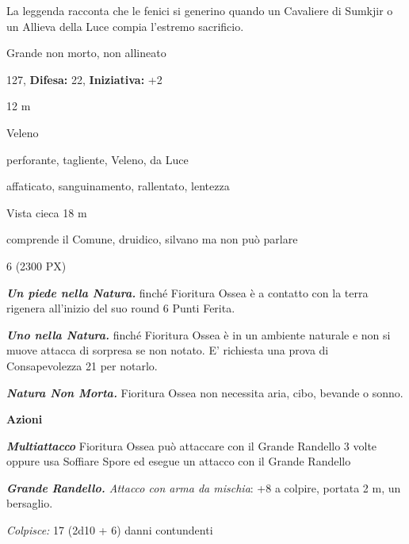 \begin{multicols}{2}
{La leggenda racconta che le fenici si generino quando un Cavaliere di Sumkjir o un Allieva della Luce compia l'estremo sacrificio.

\noindent
\begin{description}[noitemsep, topsep=0pt, parsep=0pt, partopsep=0pt, leftmargin=0cm, labelwidth=2.2cm]
	\item[\textbf{Taglia/Tipo:}] Grande non morto, non allineato
	\item[\textbf{Caratt.:}] 
	\item[\textbf{Punti Ferita:}] 127,  \textbf{Difesa:} 22,  \textbf{Iniziativa:} +2
	\item[\textbf{Movimento:}] 12 m
	\item[\textbf{Tiri Salvez.:}] 
	\item[\textbf{Imm. Danni:}] Veleno
	\item[\textbf{Res. Danni:}] perforante, tagliente, Veleno, da Luce
	\item[\textbf{Immunità:}] affaticato, sanguinamento, rallentato, lentezza
	\item[\textbf{Sensi:}] Vista cieca 18 m
	\item[\textbf{Linguaggi:}] comprende il Comune, druidico, silvano ma non può parlare
	\item[\textbf{Sfida:}] 6 (2300 PX)\smallskip
\end{description}

\emph{\textbf{Un piede nella Natura.}} finché Fioritura Ossea è a contatto con la terra rigenera all'inizio del suo round 6 Punti Ferita.

\emph{\textbf{Uno nella Natura.}} finché Fioritura Ossea è in un ambiente naturale e non si muove attacca di sorpresa se non notato. E' richiesta una prova di Consapevolezza 21 per notarlo.

\emph{\textbf{Natura Non Morta.}} Fioritura Ossea non necessita aria, cibo, bevande o sonno.

\textbf{Azioni}

\emph{\textbf{Multiattacco}} Fioritura Ossea può attaccare con il Grande Randello 3 volte oppure usa Soffiare Spore ed esegue un attacco con il Grande Randello

\emph{\textbf{Grande Randello.} Attacco con arma da mischia}: +8 a colpire, portata 2 m, un bersaglio.

\emph{Colpisce:} 17 (2d10 + 6) danni contundenti

}
\end{multicols}
